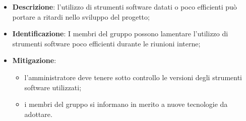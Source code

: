 \label{strumenti-software-datati}
\begin{itemize}
	\item \textbf{Descrizione}: l'utilizzo di strumenti software datati o poco
	      efficienti può portare a ritardi nello sviluppo del progetto;

	\item \textbf{Identificazione}:
	      I membri del gruppo possono lamentare l'utilizzo di strumenti
	      software poco efficienti durante le riunioni interne;

	\item \textbf{Mitigazione}:
	      \begin{itemize}
		      \item l'amministratore deve tenere sotto controllo le versioni
		            degli strumenti software utilizzati;

		      \item i membri del gruppo si informano in merito a nuove
		            tecnologie da adottare.
	      \end{itemize}
\end{itemize}
